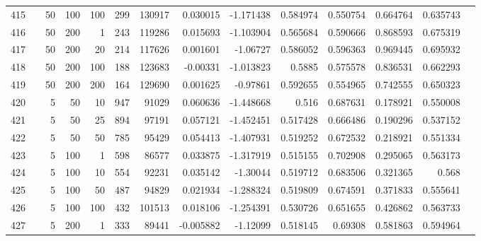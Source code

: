 \begin{longtable}{llrrrrrrrrrrrr}
		415 & &           50 &               100 &          100 &         299 &     130917 &  0.030015 & -1.171438 &  0.584974 &    0.550754 &       0.664764 &  0.635743 \\
		416 & &           50 &               200 &            1 &         243 &     119286 &  0.015693 & -1.103904 &  0.565684 &    0.590666 &       0.868593 &  0.675319 \\
		417 & &           50 &               200 &           20 &         214 &     117626 &  0.001601 &  -1.06727 &  0.586052 &    0.596363 &       0.969445 &  0.695932 \\
		418 & &           50 &               200 &          100 &         188 &     123683 &  -0.00331 & -1.013823 &    0.5885 &    0.575578 &       0.836531 &  0.662293 \\
		419 & &           50 &               200 &          200 &         164 &     129690 &  0.001625 &  -0.97861 &  0.592655 &    0.554965 &       0.742555 &  0.650323 \\\midrule
		420 & \multirow[t]{74}{*}{\rotatebox[origin=r]{90}{tfidf-spacy}} &            5 &                50 &           10 &         947 &      91029 &  0.060636 & -1.448668 &     0.516 &    0.687631 &       0.178921 &  0.550008 \\
		421 & &            5 &                50 &           25 &         894 &      97191 &  0.057121 & -1.452451 &  0.517428 &    0.666486 &       0.190296 &  0.537152 \\
		422 & &            5 &                50 &           50 &          785 &      95429 &  0.054413 & -1.407931 &  0.519252 &    0.672532 &       0.218921 &  0.551334 \\
		423 & &            5 &               100 &            1 &          598 &      86577 &  0.033875 & -1.317919 &  0.515155 &    0.702908 &       0.295065 &  0.563173 \\
		424 & &            5 &               100 &           10 &          554 &      92231 &  0.035142 &  -1.30044 &  0.519712 &    0.683506 &       0.321365 &     0.568 \\
		425 & &            5 &               100 &           50 &          487 &      94829 &  0.021934 & -1.288324 &  0.519809 &    0.674591 &       0.371833 &  0.555641 \\
		426 & &            5 &               100 &          100 &          432 &     101513 &  0.018106 & -1.254391 &  0.530726 &    0.651655 &       0.426862 &  0.563733 \\
		427 & &            5 &               200 &            1 &          333 &      89441 & -0.005882 &  -1.12099 &  0.518145 &     0.69308 &       0.581863 &  0.594964 \\

\end{longtable}
